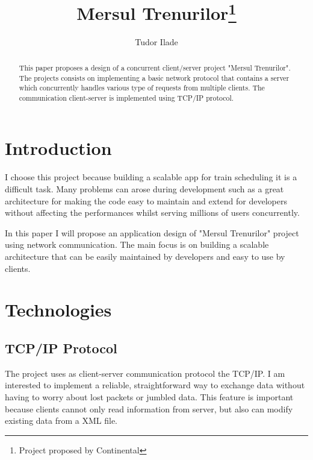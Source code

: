 \documentclass[runningheads]{llncs}
\begin{document}
%
\title{Mersul Trenurilor\thanks{Project proposed by Continental}}
%
%
\author{Tudor Ilade}
%
%
%
\maketitle              %
%
\begin{abstract}
This paper proposes a design of a concurrent client/server project "Mersul Trenurilor". The projects consists on implementing a basic network protocol that contains a server which concurrently handles various type of requests from multiple clients. The communication client-server is implemented using TCP/IP protocol.

\end{abstract}
%
%
%
\section{Introduction}
I choose this project because building a scalable app for train scheduling it is a difficult task. Many problems can arose during development such as a great architecture for making the code easy to maintain and extend for developers without affecting the performances whilst serving millions of users concurrently. 

In this paper I will propose an application design of "Mersul Trenurilor" project using network communication. The main focus is on building a scalable architecture that can be easily maintained by developers and easy to use by clients.

\section{Technologies}
\subsection{TCP/IP Protocol}
The project uses as client-server communication protocol the TCP/IP. I am interested to implement a reliable, straightforward way to exchange data without having to worry about lost packets or jumbled data. This feature is important because clients cannot only read information from server, but also can modify existing data from a XML file.
\end{document}
